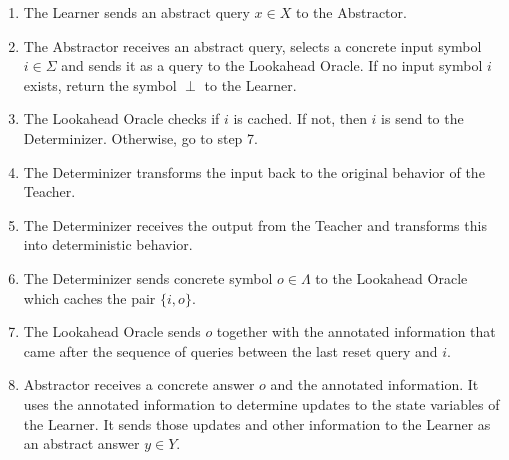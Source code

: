 \documentclass[multi,crop=false,class=article]{standalone}
\begin{document}
\begin{enumerate}
	\item The Learner sends an abstract query $x \in X$ to the Abstractor.
	\item The Abstractor receives an abstract query, selects a concrete input
	symbol $i \in \Sigma$ and sends it as a query to the Lookahead
	Oracle. If no input symbol $i$ exists, return the symbol $\perp$ to the
	Learner.
	\item The Lookahead Oracle checks if $i$ is cached. If not, then $i$ is send
	to the Determinizer. Otherwise, go to step 7.
	\item The Determinizer transforms the input back to the original behavior of
	the Teacher.
	\item The Determinizer receives the output from the Teacher and transforms
	this into deterministic behavior.
	\item The Determinizer sends concrete symbol $o \in \Lambda$ to the
	Lookahead Oracle which caches the pair $\{i,o\}$.
	\item The Lookahead Oracle sends $o$ together with the annotated information
	that came after the sequence of queries between the last reset query and
	$i$.
	\item Abstractor receives a concrete answer $o$ and the annotated
	information. It uses the annotated information to determine updates to the
	state variables of the Learner. It sends those updates and other
	information to the Learner as an abstract answer $y \in Y$.
\end{enumerate}
\end{document}
